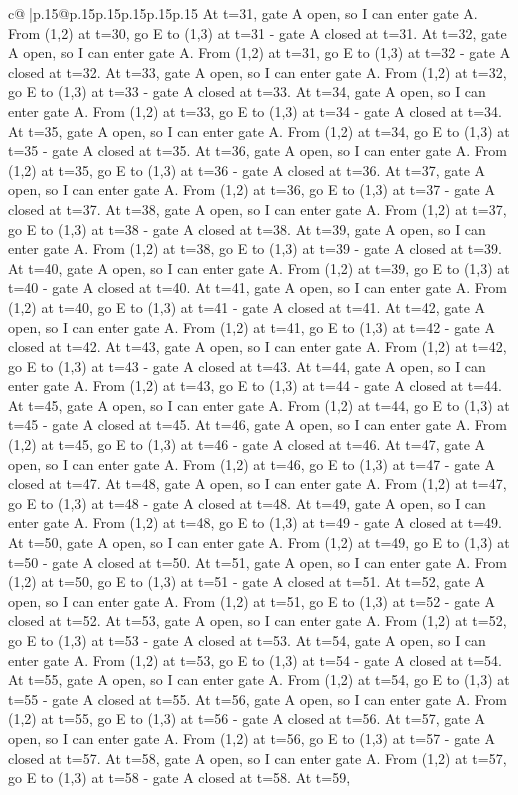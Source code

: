 \documentclass{article}
\begin{document}
{\begin{supertabular}{c@{$\;$}|p{.15\linewidth}@{}p{.15\linewidth}p{.15\linewidth}p{.15\linewidth}p{.15\linewidth}p{.15\linewidth}}
{{{At t=31, gate A open, so I can enter gate A. From (1,2) at t=30, go E to (1,3) at t=31 {-} gate A closed at t=31. At t=32, gate A open, so I can enter gate A. From (1,2) at t=31, go E to (1,3) at t=32 {-} gate A closed at t=32. At t=33, gate A open, so I can enter gate A. From (1,2) at t=32, go E to (1,3) at t=33 {-} gate A closed at t=33. At t=34, gate A open, so I can enter gate A. From (1,2) at t=33, go E to (1,3) at t=34 {-} gate A closed at t=34. At t=35, gate A open, so I can enter gate A. From (1,2) at t=34, go E to (1,3) at t=35 {-} gate A closed at t=35. At t=36, gate A open, so I can enter gate A. From (1,2) at t=35, go E to (1,3) at t=36 {-} gate A closed at t=36. At t=37, gate A open, so I can enter gate A. From (1,2) at t=36, go E to (1,3) at t=37 {-} gate A closed at t=37. At t=38, gate A open, so I can enter gate A. From (1,2) at t=37, go E to (1,3) at t=38 {-} gate A closed at t=38. At t=39, gate A open, so I can enter gate A. From (1,2) at t=38, go E to (1,3) at t=39 {-} gate A closed at t=39. At t=40, gate A open, so I can enter gate A. From (1,2) at t=39, go E to (1,3) at t=40 {-} gate A closed at t=40. At t=41, gate A open, so I can enter gate A. From (1,2) at t=40, go E to (1,3) at t=41 {-} gate A closed at t=41. At t=42, gate A open, so I can enter gate A. From (1,2) at t=41, go E to (1,3) at t=42 {-} gate A closed at t=42. At t=43, gate A open, so I can enter gate A. From (1,2) at t=42, go E to (1,3) at t=43 {-} gate A closed at t=43. At t=44, gate A open, so I can enter gate A. From (1,2) at t=43, go E to (1,3) at t=44 {-} gate A closed at t=44. At t=45, gate A open, so I can enter gate A. From (1,2) at t=44, go E to (1,3) at t=45 {-} gate A closed at t=45. At t=46, gate A open, so I can enter gate A. From (1,2) at t=45, go E to (1,3) at t=46 {-} gate A closed at t=46. At t=47, gate A open, so I can enter gate A. From (1,2) at t=46, go E to (1,3) at t=47 {-} gate A closed at t=47. At t=48, gate A open, so I can enter gate A. From (1,2) at t=47, go E to (1,3) at t=48 {-} gate A closed at t=48. At t=49, gate A open, so I can enter gate A. From (1,2) at t=48, go E to (1,3) at t=49 {-} gate A closed at t=49. At t=50, gate A open, so I can enter gate A. From (1,2) at t=49, go E to (1,3) at t=50 {-} gate A closed at t=50. At t=51, gate A open, so I can enter gate A. From (1,2) at t=50, go E to (1,3) at t=51 {-} gate A closed at t=51. At t=52, gate A open, so I can enter gate A. From (1,2) at t=51, go E to (1,3) at t=52 {-} gate A closed at t=52. At t=53, gate A open, so I can enter gate A. From (1,2) at t=52, go E to (1,3) at t=53 {-} gate A closed at t=53. At t=54, gate A open, so I can enter gate A. From (1,2) at t=53, go E to (1,3) at t=54 {-} gate A closed at t=54. At t=55, gate A open, so I can enter gate A. From (1,2) at t=54, go E to (1,3) at t=55 {-} gate A closed at t=55. At t=56, gate A open, so I can enter gate A. From (1,2) at t=55, go E to (1,3) at t=56 {-} gate A closed at t=56. At t=57, gate A open, so I can enter gate A. From (1,2) at t=56, go E to (1,3) at t=57 {-} gate A closed at t=57. At t=58, gate A open, so I can enter gate A. From (1,2) at t=57, go E to (1,3) at t=58 {-} gate A closed at t=58. At t=59, }}}
\end{supertabular}}
\end{document}
